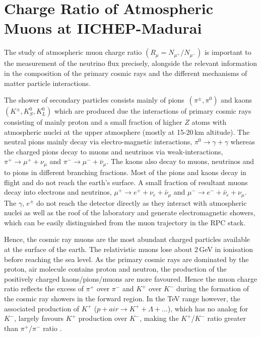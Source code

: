 
\chapter{Charge Ratio of Atmospheric Muons at IICHEP-Madurai}

The study of atmospheric muon charge ratio
$\left(R_{\mu}=N_{\mu^{+}}/N_{\mu^{-}}\right)$
is important to the measurement of the neutrino flux precisely,
alongside the relevant information in the composition of the primary
cosmic rays and the different mechanisms of matter particle
interactions.

The shower of secondary particles consists mainly of
\mbox{pions $\left(\pi^{\pm}, \pi^0\right)$} and
\mbox{kaons $\left(K^{\pm}, K^0_S, K^0_L\right)$} which are produced due
the interactions of primary cosmic rays consisting of mainly proton
and a small fraction of higher $Z$ atoms \cite{cosmic1,pdgspectra1}
with atmospheric nuclei at the upper atmosphere (mostly at 15-20\,km
altitude).
The neutral pions mainly decay via electro-magnetic interactions,
$\pi^0 \rightarrow \gamma+\gamma$ whereas the charged pions decay to
muons and neutrinos via weak-interactions,
$\pi^+ \rightarrow \mu^+ + \nu_{\mu}$ and
$\pi^- \rightarrow \mu^- + \bar{\nu}_{\mu}$. The kaons also decay to
muons, neutrinos and to pions in different branching fractions.
Most of the pions and kaons decay in flight and do not reach the
earth's surface.
A small fraction of resultant muons decay into electrons and neutrinos,
$\mu^+ \rightarrow e^+ + \nu_{e} + \bar{\nu}_{\mu}$ and
$\mu^- \rightarrow e^- + \bar{\nu}_{e} + \nu_{\mu}$.
The $\gamma$, $e^{\pm}$ do not reach the detector directly as they
interact with atmospheric nuclei as well as the roof of the laboratory
and generate electromagnetic showers, which can be easily distinguished
from the muon trajectory in the RPC stack.

Hence, the cosmic ray muons are the most abundant charged particles
available at the surface of the earth. The relativistic muons lose
about 2\,GeV in ionisation before reaching the sea level.
As the primary cosmic rays are dominated by the proton, air molecule
  contains proton and neutron, the production of the positively
  charged kaons/pions/muons are more favoured.
Hence the muon charge ratio reflects the excess of $\pi^{+}$ over
$\pi^{-}$ and $K^{+}$ over $K^{-}$ during the formation of the
cosmic ray showers in the forward region. In the TeV range however,
the associated production of $K^{+}$
($p+air \rightarrow K^{+} + \Lambda + ...$), which has no analog for $K^{-}$,
largely favours $K^{+}$ production over $K^{-}$, making the
$K^{+}$/$K^{-}$ ratio greater than $\pi^{+}$/$\pi^{-}$ ratio
\cite{adamson2007}.

